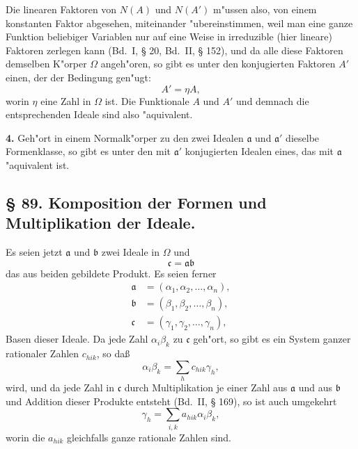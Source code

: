\documentclass[12pt,a4paper]{article}
\theoremstyle{plain}
\begin{document}
Die linearen Faktoren von $N(A)$ und $N(A')$ m"ussen also, von einem konstanten Faktor abgesehen, miteinander "ubereinstimmen, weil man eine ganze Funktion beliebiger Variablen nur auf eine Weise in irreduzible (hier lineare) Faktoren zerlegen kann (Bd.~I, \S{} 20, Bd.~II, \S{} 152), und da alle diese Faktoren demselben K"orper $\Omega$ angeh"oren, so gibt es unter den konjugierten Faktoren $A'$ einen, der der Bedingung gen"ugt:
\[
A' = \eta A,
\]
worin $\eta$ eine Zahl in $\Omega$ ist. Die Funktionale $A$ und $A'$ und demnach die entsprechenden Ideale sind also "aquivalent.

\textbf{4.} Geh"ort in einem Normalk"orper zu den zwei Idealen $\mathfrak{a}$ und $\mathfrak{a}'$ dieselbe Formenklasse, so gibt es unter den mit $\mathfrak{a}'$ konjugierten Idealen eines, das mit $\mathfrak{a}$ "aquivalent ist.

\subsection*{\S{} 89. Komposition der Formen und Multiplikation der Ideale.}

Es seien jetzt $\mathfrak{a}$ und $\mathfrak{b}$ zwei Ideale in $\Omega$ und
\begin{equation}
\mathfrak{c} = \mathfrak{a}\mathfrak{b}
\tag{1}
\end{equation}
das aus beiden gebildete Produkt. Es seien ferner
\begin{align*}
\mathfrak{a} &= (\alpha_1, \alpha_2, \ldots, \alpha_n),\\
\mathfrak{b} &= (\beta_1, \beta_2, \ldots, \beta_n),\\
\mathfrak{c} &= (\gamma_1, \gamma_2, \ldots, \gamma_n),
\end{align*}
Basen dieser Ideale. Da jede Zahl $\alpha_i\beta_k$ zu $\mathfrak{c}$ geh"ort, so gibt es ein System ganzer rationaler Zahlen $c_{hik}$, so da\ss{}
\begin{equation}
\alpha_i\beta_k = \sum_{h} c_{hik}\gamma_h,
\tag{3}
\end{equation}
wird, und da jede Zahl in $\mathfrak{c}$ durch Multiplikation je einer Zahl aus $\mathfrak{a}$ und aus $\mathfrak{b}$ und Addition dieser Produkte entsteht (Bd.~II, \S{} 169), so ist auch umgekehrt
\begin{equation}
\gamma_h = \sum_{i,k} a_{hik}\alpha_i\beta_k,
\tag{4}
\end{equation}
worin die $a_{hik}$ gleichfalls ganze rationale Zahlen sind.
\end{document}

